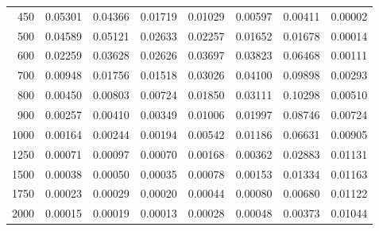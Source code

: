 \begin{table}[ht]
\begin{tabular}{r|c|c|c|c|c|c|c}
      450 & 0.05301 & 0.04366 & 0.01719 & 0.01029 & 0.00597 & 0.00411 & 0.00002 \\
      500 & 0.04589 & 0.05121 & 0.02633 & 0.02257 & 0.01652 & 0.01678 & 0.00014 \\
      600 & 0.02259 & 0.03628 & 0.02626 & 0.03697 & 0.03823 & 0.06468 & 0.00111 \\
      700 & 0.00948 & 0.01756 & 0.01518 & 0.03026 & 0.04100 & 0.09898 & 0.00293 \\
      800 & 0.00450 & 0.00803 & 0.00724 & 0.01850 & 0.03111 & 0.10298 & 0.00510 \\
      900 & 0.00257 & 0.00410 & 0.00349 & 0.01006 & 0.01997 & 0.08746 & 0.00724 \\
     1000 & 0.00164 & 0.00244 & 0.00194 & 0.00542 & 0.01186 & 0.06631 & 0.00905 \\
     1250 & 0.00071 & 0.00097 & 0.00070 & 0.00168 & 0.00362 & 0.02883 & 0.01131 \\
     1500 & 0.00038 & 0.00050 & 0.00035 & 0.00078 & 0.00153 & 0.01334 & 0.01163 \\
     1750 & 0.00023 & 0.00029 & 0.00020 & 0.00044 & 0.00080 & 0.00680 & 0.01122 \\
     2000 & 0.00015 & 0.00019 & 0.00013 & 0.00028 & 0.00048 & 0.00373 & 0.01044 \\ \cline{1-8}
    \end{tabular}
    \label{tab:XRayEffSCX4}
\end{table}

